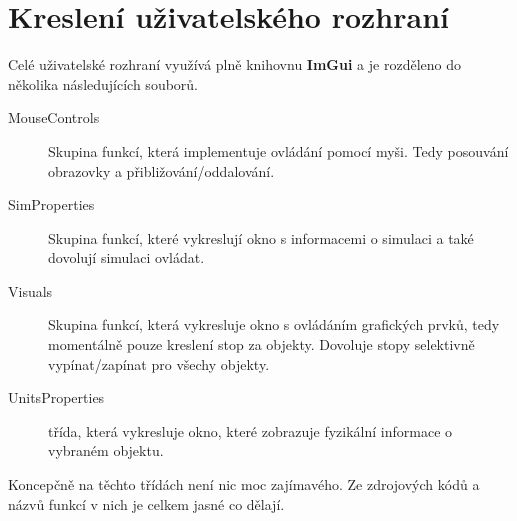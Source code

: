 \section{Kreslení uživatelského rozhraní}
Celé uživatelské rozhraní využívá plně knihovnu \textbf{ImGui} a je rozděleno do několika následujících souborů.
\begin{description}
	\item[MouseControls] Skupina funkcí, která implementuje ovládání pomocí myši. Tedy posouvání obrazovky a přibližování/oddalování.
	\item[SimProperties] Skupina funkcí, které vykreslují okno s informacemi o simulaci a také dovolují simulaci ovládat.
	\item[Visuals] Skupina funkcí, která vykresluje okno s ovládáním grafických prvků, tedy momentálně pouze kreslení stop za objekty. Dovoluje stopy selektivně vypínat/zapínat pro všechy objekty.
	\item[UnitsProperties] třída, která vykresluje okno, které zobrazuje fyzikální informace o vybraném objektu.
\end{description}
Koncepčně na těchto třídách není nic moc zajímavého. Ze zdrojových kódů a názvů funkcí v nich je celkem jasné co dělají.


